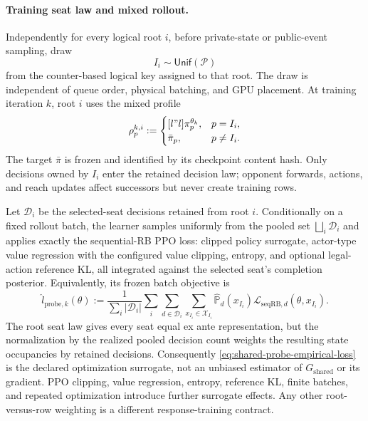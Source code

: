 \documentclass[12pt, a4paper]{article}
\begin{document}
\paragraph{Training seat law and mixed rollout.}
Independently for every logical root $i$, before private-state or public-event
sampling, draw
\begin{equation}\label{eq:probe-seat-law}
  I_i\sim\mathsf{Unif}(\mathcal P)
\end{equation}
from the counter-based logical key assigned to that root.  The draw is
independent of queue order, physical batching, and GPU placement.  At training
iteration $k$, root $i$ uses the mixed profile
\begin{equation}\label{eq:mixed-probe-rollout-profile}
  \rho^{k,i}_p
  :=
  \begin{cases}[l"l]
    \pi_p^{\theta_k},&p=I_i,\\
    \bar\pi_p,&p\neq I_i.
  \end{cases}
\end{equation}
The target $\bar\pi$ is frozen and identified by its checkpoint content hash.
Only decisions owned by $I_i$ enter the retained decision law; opponent
forwards, actions, and reach updates affect successors but never create
training rows.

Let $\mathcal D_i$ be the selected-seat decisions retained from root $i$.
Conditionally on a fixed rollout batch, the learner samples uniformly from the
pooled set $\bigsqcup_i\mathcal D_i$ and applies exactly the sequential-RB PPO
loss: clipped policy surrogate, actor-type value regression with the configured
value clipping, entropy, and optional legal-action reference KL, all integrated
against the selected seat's completion posterior.  Equivalently, its frozen
batch objective is
\begin{equation}\label{eq:shared-probe-empirical-loss}
  \widehat l_{\mathrm{probe},k}(\theta)
  :=
  \frac{1}{\sum_i|\mathcal D_i|}
  \sum_i\sum_{d\in\mathcal D_i}
  \sum_{x_{I_i}\in\mathcal X_{I_i}}
  \widehat{\mathbb P}_d(x_{I_i})
  \mathcal L_{\mathrm{seqRB},d}(\theta,x_{I_i}).
\end{equation}
The root seat law gives every seat equal ex ante representation, but the
normalization by the realized pooled decision count weights the resulting
state occupancies by retained decisions.  Consequently
\autoref{eq:shared-probe-empirical-loss} is the declared optimization surrogate,
not an unbiased estimator of $G_{\mathrm{shared}}$ or its gradient.  PPO
clipping, value regression, entropy, reference KL, finite batches, and repeated
optimization introduce further surrogate effects.  Any other root-versus-row
weighting is a different response-training contract.
\end{document}
